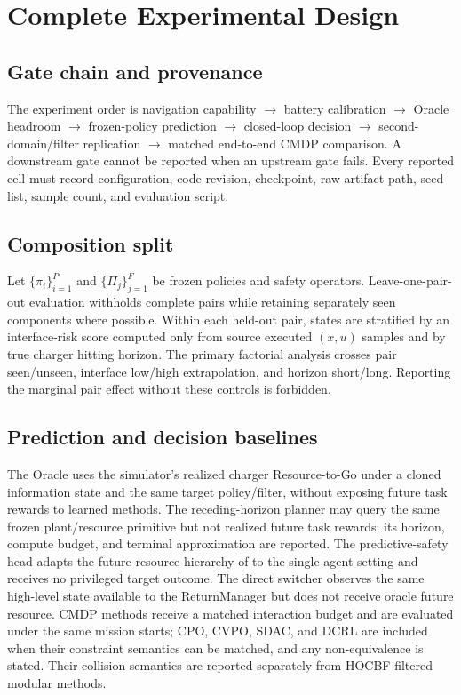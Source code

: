 \section{Complete Experimental Design}
\label{app:experimental}

\subsection{Gate chain and provenance}

The experiment order is navigation capability $\rightarrow$ battery calibration $\rightarrow$ Oracle headroom $\rightarrow$ frozen-policy prediction $\rightarrow$ closed-loop decision $\rightarrow$ second-domain/filter replication $\rightarrow$ matched end-to-end CMDP comparison. A downstream gate cannot be reported when an upstream gate fails. Every reported cell must record configuration, code revision, checkpoint, raw artifact path, seed list, sample count, and evaluation script.

\subsection{Composition split}

Let \(\{\pi_i\}_{i=1}^P\) and \(\{\Pi_j\}_{j=1}^F\) be frozen policies and safety operators. Leave-one-pair-out evaluation withholds complete pairs while retaining separately seen components where possible. Within each held-out pair, states are stratified by an interface-risk score computed only from source executed \((x,u)\) samples and by true charger hitting horizon. The primary factorial analysis crosses pair seen/unseen, interface low/high extrapolation, and horizon short/long. Reporting the marginal pair effect without these controls is forbidden.

\subsection{Prediction and decision baselines}



The Oracle uses the simulator's realized charger Resource-to-Go under a cloned information state and the same target policy/filter, without exposing future task rewards to learned methods. The receding-horizon planner may query the same frozen plant/resource primitive but not realized future task rewards; its horizon, compute budget, and terminal approximation are reported. The predictive-safety head adapts the future-resource hierarchy of \citet{guo2020predictive} to the single-agent setting and receives no privileged target outcome. The direct switcher observes the same high-level state available to the ReturnManager but does not receive oracle future resource. CMDP methods receive a matched interaction budget and are evaluated under the same mission starts; CPO, CVPO, SDAC, and DCRL are included when their constraint semantics can be matched, and any non-equivalence is stated. Their collision semantics are reported separately from HOCBF-filtered modular methods.

